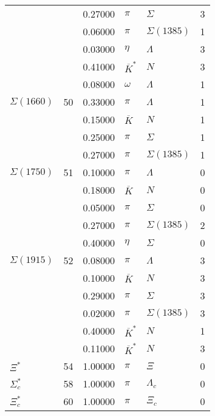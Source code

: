 \documentclass[a4paper,10pt]{article}
\begin{document}
\begin{tabular}[t]{lrllll}
$                    $&   & 0.27000&$ \pi                 $ &$ \Sigma              $& 3\\
$                    $&   & 0.06000&$ \pi                 $ &$ \Sigma(1385)        $& 1\\
$                    $&   & 0.03000&$ \eta                $ &$ \Lambda             $& 3\\
$                    $&   & 0.41000&$ \overline{K}^*      $ &$ N                   $& 3\\
$                    $&   & 0.08000&$ \omega              $ &$ \Lambda             $& 1\\
\midrule
$      \Sigma(1660)  $& 50& 0.33000&$ \pi                 $ &$ \Lambda             $& 1\\
$                    $&   & 0.15000&$ \overline{K}        $ &$ N                   $& 1\\
$                    $&   & 0.25000&$ \pi                 $ &$ \Sigma              $& 1\\
$                    $&   & 0.27000&$ \pi                 $ &$ \Sigma(1385)        $& 1\\
\midrule
$      \Sigma(1750)  $& 51& 0.10000&$ \pi                 $ &$ \Lambda             $& 0\\
$                    $&   & 0.18000&$ \overline{K}        $ &$ N                   $& 0\\
$                    $&   & 0.05000&$ \pi                 $ &$ \Sigma              $& 0\\
$                    $&   & 0.27000&$ \pi                 $ &$ \Sigma(1385)        $& 2\\
$                    $&   & 0.40000&$ \eta                $ &$ \Sigma              $& 0\\
\midrule
$      \Sigma(1915)  $& 52& 0.08000&$ \pi                 $ &$ \Lambda             $& 3\\
$                    $&   & 0.10000&$ \overline{K}        $ &$ N                   $& 3\\
$                    $&   & 0.29000&$ \pi                 $ &$ \Sigma              $& 3\\
$                    $&   & 0.02000&$ \pi                 $ &$ \Sigma(1385)        $& 3\\
$                    $&   & 0.40000&$ \overline{K}^*      $ &$ N                   $& 1\\
$                    $&   & 0.11000&$ \overline{K}^*      $ &$ N                   $& 3\\
\midrule
$      \Xi^*         $& 54& 1.00000&$ \pi                 $ &$ \Xi                 $& 0\\
\midrule
$      \Sigma_c^*    $& 58& 1.00000&$ \pi                 $ &$ \Lambda_c           $& 0\\
\midrule
$      \Xi_c^*       $& 60& 1.00000&$ \pi                 $ &$ \Xi_c               $& 0\\
\bottomrule
\end{tabular}
\end{document}
